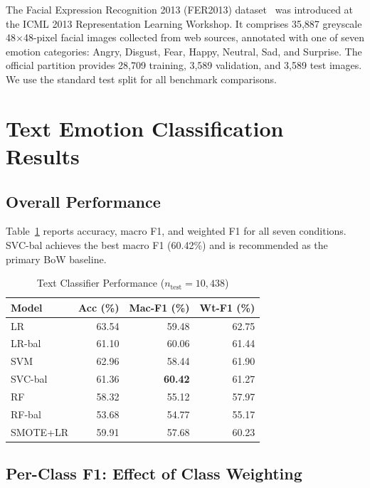 \documentclass[sigconf, review=true]{acmart}
\begin{document}
The Facial Expression Recognition 2013 (FER2013)
dataset~\cite{goodfellow2013fer} was introduced at the ICML 2013
Representation Learning Workshop.
It comprises 35,887 greyscale 48$\times$48-pixel facial images
collected from web sources, annotated with one of seven emotion
categories: Angry, Disgust, Fear, Happy, Neutral, Sad, and
Surprise.
The official partition provides 28,709 training, 3,589
validation, and 3,589 test images.
We use the standard test split for all benchmark comparisons.

\section{Text Emotion Classification Results}
\label{sec:results}

\subsection{Overall Performance}

Table~\ref{tab:summary} reports accuracy, macro F1, and
weighted F1 for all seven conditions.
SVC-bal achieves the best macro F1 (60.42\%) and is
recommended as the primary BoW baseline.

\begin{table}[htbp]
\centering
\caption{Text Classifier Performance ($n_{\text{test}}{=}10{,}438$)}
\label{tab:summary}
\begin{tabular}{lrrr}
\toprule
\textbf{Model} & \textbf{Acc (\%)} & \textbf{Mac-F1 (\%)} &
\textbf{Wt-F1 (\%)} \\
\midrule
LR          & 63.54 & 59.48 & 62.75 \\
LR-bal      & 61.10 & 60.06 & 61.44 \\
SVM         & 62.96 & 58.44 & 61.90 \\
SVC-bal     & 61.36 & \textbf{60.42} & 61.27 \\
RF          & 58.32 & 55.12 & 57.97 \\
RF-bal      & 53.68 & 54.77 & 55.17 \\
SMOTE+LR    & 59.91 & 57.68 & 60.23 \\
\bottomrule
\end{tabular}
\end{table}

\subsection{Per-Class F1: Effect of Class Weighting}
\end{document}
